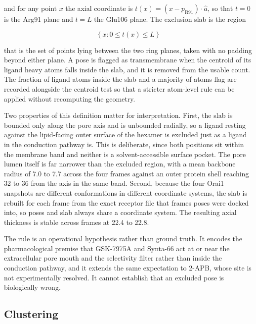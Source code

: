 and for any point \(x\) the axial coordinate is \(t(x) = (x - p_{\text{R91}}) \cdot \hat{a}\), so that \(t = 0\) is the Arg91 plane and \(t = L\) the Glu106 plane. The exclusion slab is the region

\[\left\{ x : 0 \leq t(x) \leq L \right\}\]

that is the set of points lying between the two ring planes, taken with no padding beyond either plane. A pose is flagged as transmembrane when the centroid of its ligand heavy atoms falls inside the slab, and it is removed from the usable count. The fraction of ligand atoms inside the slab and a majority-of-atoms flag are recorded alongside the centroid test so that a stricter atom-level rule can be applied without recomputing the geometry.

Two properties of this definition matter for interpretation. First, the slab is bounded only along the pore axis and is unbounded radially, so a ligand resting against the lipid-facing outer surface of the hexamer is excluded just as a ligand in the conduction pathway is. This is deliberate, since both positions sit within the membrane band and neither is a solvent-accessible surface pocket. The pore lumen itself is far narrower than the excluded region, with a mean backbone radius of 7.0 to 7.7\angstrom{} across the four frames against an outer protein shell reaching 32 to 36\angstrom{} from the axis in the same band. Second, because the four Orai1 snapshots are different conformations in different coordinate systems, the slab is rebuilt for each frame from the exact receptor file that frame\textquotesingle s poses were docked into, so poses and slab always share a coordinate system. The resulting axial thickness is stable across frames at 22.4 to 22.8\angstrom{}.

The rule is an operational hypothesis rather than ground truth. It encodes the pharmacological premise that GSK-7975A and Synta-66 act at or near the extracellular pore mouth and the selectivity filter rather than inside the conduction pathway, and it extends the same expectation to 2-APB, whose site is not experimentally resolved. It cannot establish that an excluded pose is biologically wrong.

\hypertarget{clustering}{%
\subsection{Clustering}\label{clustering}}


